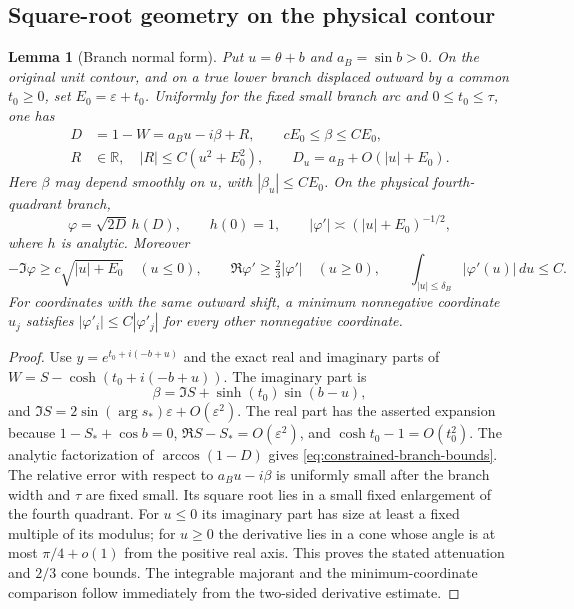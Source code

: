 \documentclass[11pt]{article}
\numberwithin{equation}{section}
\newtheorem{lemma}[theorem]{Lemma}
\theoremstyle{remark}\newtheorem{remark}[theorem]{Remark}
\begin{document}
\subsection{Square-root geometry on the physical contour}
\begin{lemma}[Branch normal form]\label{lem:constrained-branch-geometry}
Put $u=\theta+b$ and $a_B=\sin b>0$.  On the original unit
contour, and on a true lower branch displaced outward by a common
$t_0\ge0$, set $E_0=\varepsilon+t_0$.  Uniformly for the fixed
small branch arc and $0\le t_0\le\tau$, one has
\[
 \begin{aligned}
 D&=1-W=a_Bu-i\beta+R,\qquad cE_0\le\beta\le CE_0,\\
 R&\in\mathbb R,\quad |R|\le C(u^2+E_0^2),\qquad
 D_u=a_B+O(|u|+E_0).
 \end{aligned}
\]
Here $\beta$ may depend smoothly on $u$, with
$|\beta_u|\le CE_0$.  On the physical fourth-quadrant branch,
\begin{equation}\label{eq:constrained-branch-bounds}
 \varphi=\sqrt{2D}\,h(D),\qquad h(0)=1,
 \qquad |\varphi'|\asymp(|u|+E_0)^{-1/2},
\end{equation}
where $h$ is analytic.  Moreover
\[
 -\Im\varphi\ge c\sqrt{|u|+E_0}\quad(u\le0),\qquad
 \Re\varphi'\ge\tfrac23|\varphi'|\quad(u\ge0),\qquad
 \int_{|u|\le\delta_B}|\varphi'(u)|\,du\le C.
\]
For coordinates with the same outward shift, a minimum nonnegative
coordinate $u_j$ satisfies $|\varphi'_i|\le C|\varphi'_j|$
for every other nonnegative coordinate.

\end{lemma}
\begin{proof}
Use $y=e^{t_0+i(-b+u)}$ and the exact real and imaginary parts of
$W=S-\cosh(t_0+i(-b+u))$.  The imaginary part is
\[
 \beta=\Im S+\sinh(t_0)\sin(b-u),
\]
and $\Im S=2\sin(\arg s_*)\varepsilon+O(\varepsilon^2)$.
The real part has the asserted expansion because
$1-S_*+\cos b=0$, $\Re S-S_*=O(\varepsilon^2)$, and
$\cosh t_0-1=O(t_0^2)$.  The analytic factorization of
$\arccos(1-D)$ gives \eqref{eq:constrained-branch-bounds}.
The relative error with respect to $a_Bu-i\beta$ is uniformly
small after the branch width and $\tau$ are fixed small.  Its
square root lies in a small fixed enlargement of the fourth quadrant.
For $u\le0$
its imaginary part has size at least a fixed multiple of its modulus;
for $u\ge0$ the derivative lies in a cone whose angle is at most
$\pi/4+o(1)$ from the positive real axis.  This proves the stated
attenuation and $2/3$ cone bounds.  The integrable majorant and the
minimum-coordinate comparison follow immediately from the two-sided
derivative estimate.

\end{proof}
\end{document}
